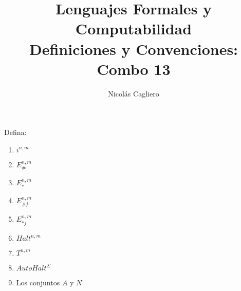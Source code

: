 \documentclass{article}
\title{Lenguajes Formales y Computabilidad \\
        \large Definiciones y Convenciones: Combo 13 }
\author{Nicolás Cagliero}
\begin{document}
\maketitle

Defina:

\begin{enumerate}
    \item $i^{n, m}$
    \item $E_{\#}^{n, m}$
    \item $E_{*}^{n, m}$
    \item $E_{\#j}^{n, m}$
    \item $E_{*j}^{n, m}$
    \item $Halt^{n, m}$
    \item $T^{n, m}$
    \item $AutoHalt^{\Sigma}$
    \item Los conjuntos $A$ y $N$
\end{enumerate}
\end{document}
